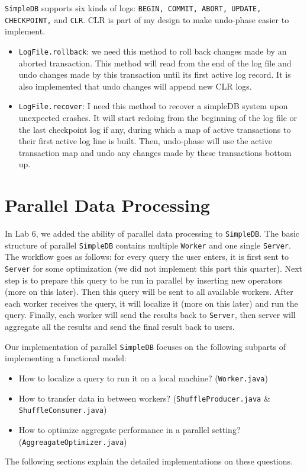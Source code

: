\documentclass[12pt]{myland}
\def\<#1>{\texttt{#1}}
\begin{document}
    \<SimpleDB> supports six kinds of logs: \<BEGIN, COMMIT, ABORT, UPDATE, CHECKPOINT,> and \<CLR>. CLR is part of my
    design to make undo-phase easier to implement.

    \begin{itemize}
        \item \texttt{LogFile.rollback}: we need this method to roll back changes made by an aborted transaction. This
        method will read from the end of the log file and undo changes made by this transaction until its first active
        log record. It is also implemented that undo changes will append new CLR logs.

        \item \texttt{LogFile.recover}: I need this method to recover a simpleDB system upon unexpected crashes. It
        will start redoing from the beginning of the log file or the last checkpoint log if any, during which a map of
        active transactions to their first active log line is built. Then, undo-phase will use the active transaction
        map and undo any changes made by these transactions bottom up.
	\end{itemize}

\section{Parallel Data Processing}
	\label{parallel}

    In Lab 6, we added the ability of parallel data processing to \<SimpleDB>. The basic structure of parallel \<SimpleDB>
    contains multiple \<Worker> and one single \<Server>. The workflow goes as follows: for every query the user enters,
    it is first sent to
    \<Server> for some optimization (we did not implement this part this quarter). Next step is to prepare this query to
    be run in parallel by inserting new operators (more on this later). Then this query will be sent to all
    available workers. After each worker receives the query, it will localize it (more on this later) and run the query.
    Finally, each worker will send the results back to \<Server>, then server will aggregate all the results and send
    the final result back to users. \par

    Our implementation of parallel \<SimpleDB> focuses on the following subparts of implementing a functional model:
    \begin{itemize}
        \item How to localize a query to run it on a local machine? (\<Worker.java>)
        \item How to transfer data in between workers? (\<ShuffleProducer.java> \& \<ShuffleConsumer.java>)
        \item How to optimize aggregate performance in a parallel setting? (\<AggreagateOptimizer.java>)
    \end{itemize}
    The following sections explain the detailed implementations on these questions.
\end{document}
